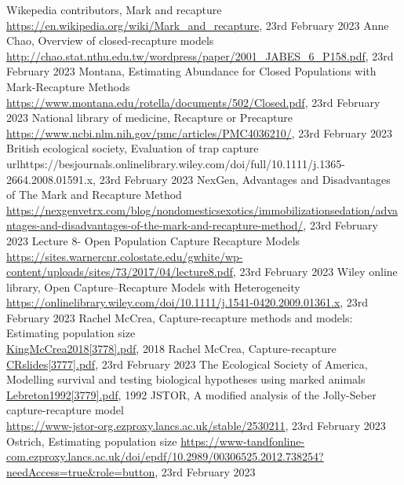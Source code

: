 \documentclass[,oneside]{article}
\numberwithin{equation}{section}
\begin{document}
\begin{thebibliography}{1}
Wikepedia contributors, Mark and recapture\\ \url{https://en.wikipedia.org/wiki/Mark_and_recapture}, 23rd February 2023
Anne Chao, Overview of closed-recapture models \\
\url{http://chao.stat.nthu.edu.tw/wordpress/paper/2001_JABES_6_P158.pdf}, 23rd February 2023
Montana, Estimating Abundance for Closed Populations with Mark-Recapture Methods\\
\url{https://www.montana.edu/rotella/documents/502/Closed.pdf}, 23rd February 2023
National library of medicine, Recapture or Precapture\\
\url{https://www.ncbi.nlm.nih.gov/pmc/articles/PMC4036210/}, 23rd February 2023
British ecological society, Evaluation of trap capture\\
url{https://besjournals.onlinelibrary.wiley.com/doi/full/10.1111/j.1365-2664.2008.01591.x}, 23rd February 2023
NexGen, Advantages and Disadvantages of The Mark and Recapture Method\\
\url{https://nexgenvetrx.com/blog/nondomesticsexotics/immobilizationsedation/advantages-and-disadvantages-of-the-mark-and-recapture-method/}, 23rd February 2023 
Lecture 8- Open Population Capture Recapture Models\\
\url{https://sites.warnercnr.colostate.edu/gwhite/wp-content/uploads/sites/73/2017/04/lecture8.pdf}, 23rd February 2023
Wiley online library, Open Capture–Recapture Models with Heterogeneity\\
\url{https://onlinelibrary.wiley.com/doi/10.1111/j.1541-0420.2009.01361.x}, 23rd February 2023
Rachel McCrea, Capture-recapture methods and models: Estimating population size\\
\url{KingMcCrea2018[3778].pdf}, 2018
Rachel McCrea, Capture-recapture\\
\url{CRslides[3777].pdf}, 23rd February 2023
The Ecological Society of America, Modelling survival and testing biological hypotheses using marked animals\\
\url{Lebreton1992[3779].pdf}, 1992
JSTOR, A modified analysis of the Jolly-Seber capture-recapture model\\
\url{https://www-jstor-org.ezproxy.lancs.ac.uk/stable/2530211}, 23rd February 2023
Ostrich, Estimating population size
\url{https://www-tandfonline-com.ezproxy.lancs.ac.uk/doi/epdf/10.2989/00306525.2012.738254?needAccess=true&role=button}, 23rd February 2023
\end{thebibliography}
\end{document}
